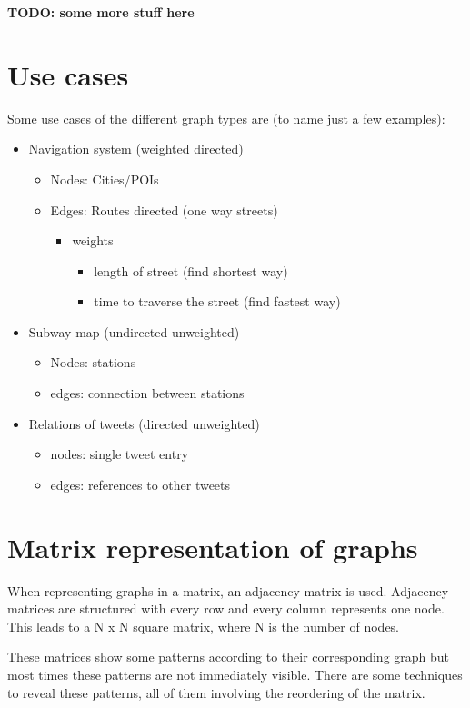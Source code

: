 \textbf{TODO: some more stuff here}

\section{Use cases}
Some use cases of the different graph types are (to name just a few examples):
\begin{itemize}
\item Navigation system (weighted directed)
	\begin{itemize}
		\item Nodes: Cities/POIs
		\item Edges: Routes directed (one way streets)
		\begin{itemize}
			\item weights
			\begin{itemize}
				\item length of street (find shortest way)
				\item time to traverse the street (find fastest way)
			\end{itemize}		
		\end{itemize}
	\end{itemize}		
\item Subway map (undirected unweighted)
\begin{itemize}
	\item Nodes: stations
	\item edges: connection between stations
\end{itemize}
\item Relations of tweets (directed unweighted)
\begin{itemize}
	\item nodes: single tweet entry
	\item edges: references to other tweets
\end{itemize}
\end{itemize}




\section{Matrix representation of graphs}

When representing graphs in a matrix, an adjacency matrix is used. Adjacency matrices are structured with every row and every column represents one node. This leads to a N x N square matrix, where N is the number of nodes. 

These matrices show some patterns according to their corresponding graph but most times these patterns are not immediately visible. There are some techniques to reveal these patterns, all of them involving the reordering of the matrix.


